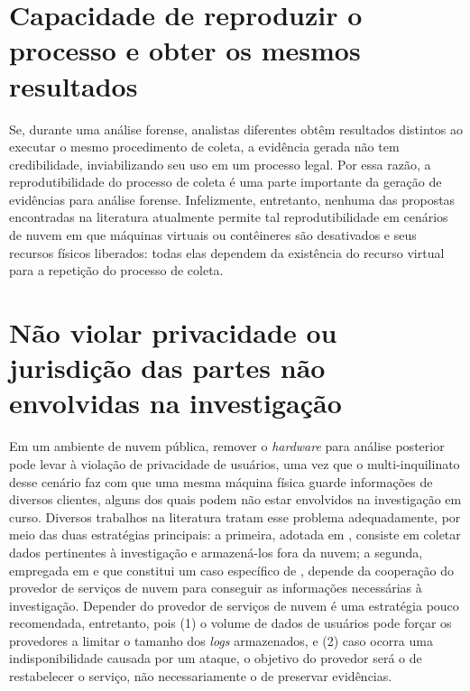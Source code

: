 \section{Capacidade de reproduzir o processo e obter os mesmos resultados}
\label{sec:reprodutibilidade}

Se, durante uma análise forense, analistas diferentes obtêm resultados distintos ao executar o mesmo procedimento de coleta, a evidência gerada não tem credibilidade, inviabilizando seu uso em um processo legal. 
%
Por essa razão, a reprodutibilidade do processo de coleta é uma parte importante da geração de evidências para análise forense.
%
Infelizmente, entretanto, nenhuma das propostas encontradas na literatura atualmente permite tal reprodutibilidade em cenários de nuvem em que máquinas virtuais ou contêineres são desativados e seus recursos físicos liberados: todas elas dependem da existência do recurso virtual para a repetição do processo de coleta.

\section{Não violar privacidade ou jurisdição das partes não envolvidas na investigação}
\label{sec:legais}

Em um ambiente de nuvem pública, remover o \textit{hardware} para análise posterior pode levar à violação de privacidade de usuários, uma vez que o multi-inquilinato desse cenário faz com que uma mesma máquina física guarde informações de diversos clientes, alguns dos quais podem não estar envolvidos na investigação em curso.
%
Diversos trabalhos na literatura tratam esse problema adequadamente, por meio das duas estratégias principais: a primeira, adotada em \cite{ReichertAutoAcquisition:2015,GeorgeDF2CE:2012,PoiselVMI:2013,DykstraFROST:2013,FaaSIndexedSearch:2012}, consiste em coletar dados pertinentes à investigação e armazená-los fora da nuvem; a segunda, empregada em \cite{SangLogApproach:2013} e que constitui um caso específico de \cite{GeorgeDF2CE:2012}, depende da cooperação do provedor de serviços de nuvem para conseguir as informações necessárias à investigação. 
%
Depender do provedor de serviços de nuvem é uma estratégia pouco recomendada, entretanto, pois (1) o volume de dados de usuários pode forçar os provedores a limitar o tamanho dos \textit{logs} armazenados, e (2) caso ocorra uma indisponibilidade causada por um ataque, o objetivo do provedor será o de restabelecer o serviço, não necessariamente o de preservar evidências\cite{ClarkeReviewOfChallenges2015}. 


